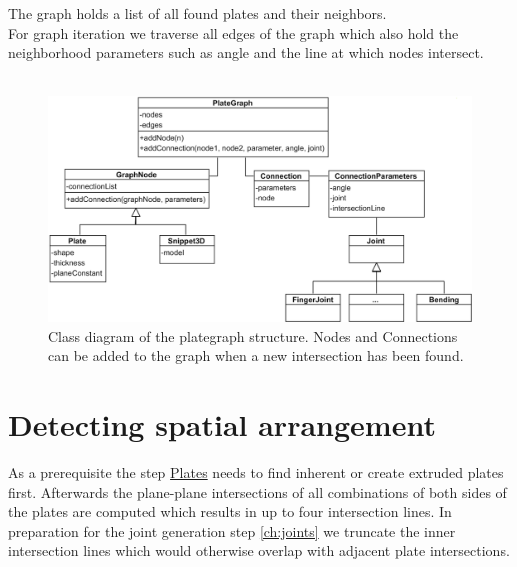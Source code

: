 \documentclass[../ClassicThesis.tex]{subfiles}
\begin{document}
The graph holds a list of all found plates and their neighbors. \\
For graph iteration we traverse all edges of the graph which also hold the neighborhood parameters such as angle and the line at which nodes intersect.\\\* \\
\hspace*{-1.8cm}
\begin{figure}[!ht]
\centering
\includegraphics[width=1\columnwidth]{Images/GraphStructure.png}
\caption{Class diagram of the plategraph structure. Nodes and Connections can be added to the graph when a new intersection has been found. }
\end{figure}


\section{Detecting spatial arrangement}
As a prerequisite the step \hyperref[ch:plates]{Plates} needs to find inherent or create extruded plates first. Afterwards the plane-plane intersections of all combinations of both sides of the plates are computed which results in up to four intersection lines. In preparation for the joint generation step \ref{ch:joints} we truncate the inner intersection lines which would otherwise overlap with adjacent plate intersections.
\end{document}
